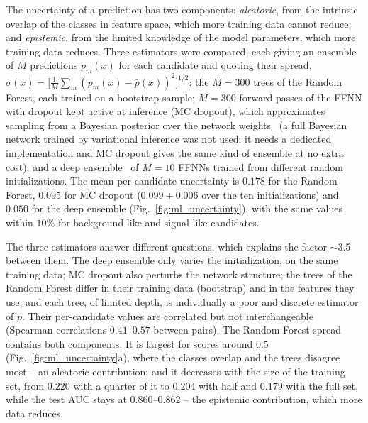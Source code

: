 The uncertainty of a prediction has two components: \emph{aleatoric}, from the intrinsic overlap of the classes in feature space, which more training data cannot reduce, and \emph{epistemic}, from the limited knowledge of the model parameters, which more training data reduces. Three estimators were compared, each giving an ensemble of $M$ predictions $p_m(x)$ for each candidate and quoting their spread, $\sigma(x)=\big[\frac1M\sum_m (p_m(x)-\bar p(x))^2\big]^{1/2}$: the $M=300$ trees of the Random Forest, each trained on a bootstrap sample; $M=300$ forward passes of the FFNN with dropout kept active at inference (MC dropout), which approximates sampling from a Bayesian posterior over the network weights~\cite{gal_mcdropout} (a full Bayesian network trained by variational inference was not used: it needs a dedicated implementation and MC dropout gives the same kind of ensemble at no extra cost); and a deep ensemble~\cite{deep_ensembles} of $M=10$ FFNNs trained from different random initializations. The mean per-candidate uncertainty is $0.178$ for the Random Forest, $0.095$ for MC dropout ($0.099\pm0.006$ over the ten initializations) and $0.050$ for the deep ensemble (Fig.~\ref{fig:ml_uncertainty}), with the same values within $10\%$ for background-like and signal-like candidates.

The three estimators answer different questions, which explains the factor $\sim$3.5 between them. The deep ensemble only varies the initialization, on the same training data; MC dropout also perturbs the network structure; the trees of the Random Forest differ in their training data (bootstrap) and in the features they use, and each tree, of limited depth, is individually a poor and discrete estimator of $p$. Their per-candidate values are correlated but not interchangeable (Spearman correlations $0.41$--$0.57$ between pairs). The Random Forest spread contains both components. It is largest for scores around $0.5$ (Fig.~\ref{fig:ml_uncertainty}a), where the classes overlap and the trees disagree most -- an aleatoric contribution; and it decreases with the size of the training set, from $0.220$ with a quarter of it to $0.204$ with half and $0.179$ with the full set, while the test AUC stays at $0.860$--$0.862$ -- the epistemic contribution, which more data reduces.



